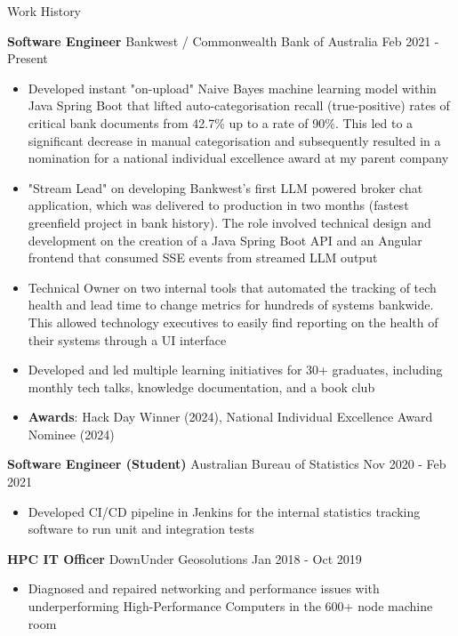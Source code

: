 \documentclass{resume} %
\begin{document}
	\begin{rSection}{Work History}
		\vspace{-0.8em}
		\item \textbf{Software Engineer} {Bankwest / Commonwealth Bank of Australia} \hfill Feb 2021 - Present
		\begin{itemize} 
			\item Developed instant "on-upload" Naive Bayes machine learning model within Java Spring Boot that lifted auto-categorisation recall (true-positive) rates of critical bank documents from 42.7\% up to a rate of 90\%. This led to a significant decrease in manual categorisation and subsequently resulted in a nomination for a national individual excellence award at my parent company
			\item "Stream Lead" on developing Bankwest's first LLM powered broker chat application, which was delivered to production in two months (fastest greenfield project in bank history). The role involved technical design and development on the creation of a Java Spring Boot API and an Angular frontend that consumed SSE events from streamed LLM output
			\item Technical Owner on two internal tools that automated the tracking of tech health and lead time to change metrics
for hundreds of systems bankwide. This allowed technology executives to easily find reporting on the health of their systems
through a UI interface		
			\item Developed and led multiple learning initiatives for 30+ graduates, including monthly tech talks, knowledge documentation, and a book club
			\item \textbf{Awards}: Hack Day Winner (2024), National Individual Excellence Award Nominee (2024) 
		\end{itemize}
		\item \textbf{Software Engineer (Student)} {Australian Bureau of Statistics} \hfill Nov 2020 - Feb 2021
		\begin{itemize} 
			\item Developed CI/CD pipeline in Jenkins for the internal statistics tracking software to run unit and integration tests
		\end{itemize}
		\item \textbf{HPC IT Officer} {DownUnder Geosolutions} \hfill Jan 2018 - Oct 2019
		\begin{itemize} 
			\item  Diagnosed and repaired networking and performance issues with underperforming High-Performance Computers in the 600+ node machine room
		\end{itemize}

	\end{rSection} 
\end{document}
